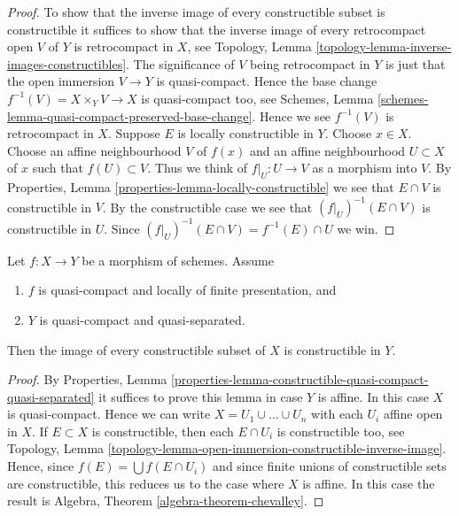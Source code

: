 \begin{proof}
To show that the inverse image of every constructible subset is constructible
it suffices to show that the inverse image of every retrocompact open $V$
of $Y$ is retrocompact in $X$, see
Topology, Lemma \ref{topology-lemma-inverse-images-constructibles}.
The significance of $V$ being retrocompact
in $Y$ is just that the open immersion $V \to Y$ is quasi-compact.
Hence the base change $f^{-1}(V) = X \times_Y V \to X$ is quasi-compact
too, see
Schemes, Lemma \ref{schemes-lemma-quasi-compact-preserved-base-change}.
Hence we see $f^{-1}(V)$ is retrocompact in $X$.
Suppose $E$ is locally constructible in $Y$.
Choose $x \in X$. Choose an affine neighbourhood $V$ of $f(x)$ and
an affine neighbourhood $U \subset X$ of $x$ such that $f(U) \subset V$.
Thus we think of $f|_U : U \to V$ as a morphism into $V$. By
Properties, Lemma \ref{properties-lemma-locally-constructible}
we see that $E \cap V$ is constructible in $V$. By the constructible case
we see that $(f|_U)^{-1}(E \cap V)$ is constructible in $U$.
Since $(f|_U)^{-1}(E \cap V) = f^{-1}(E) \cap U$ we win.
\end{proof}

\begin{lemma}
\label{lemma-chevalley}
Let $f : X \to Y$ be a morphism of schemes.
Assume
\begin{enumerate}
\item $f$ is quasi-compact and locally of finite presentation, and
\item $Y$ is quasi-compact and quasi-separated.
\end{enumerate}
Then the image of every constructible subset of $X$ is constructible in $Y$.
\end{lemma}

\begin{proof}
By
Properties,
Lemma \ref{properties-lemma-constructible-quasi-compact-quasi-separated}
it suffices to prove this lemma in case $Y$ is affine.
In this case $X$ is quasi-compact. Hence we can write
$X = U_1 \cup \ldots \cup U_n$ with each $U_i$ affine open in $X$.
If $E \subset X$ is constructible, then each $E \cap U_i$ is constructible
too, see
Topology,
Lemma \ref{topology-lemma-open-immersion-constructible-inverse-image}.
Hence, since $f(E) = \bigcup f(E \cap U_i)$ and since finite unions of
constructible sets are constructible, this reduces us to the case where
$X$ is affine. In this case the result is
Algebra, Theorem \ref{algebra-theorem-chevalley}.
\end{proof}

